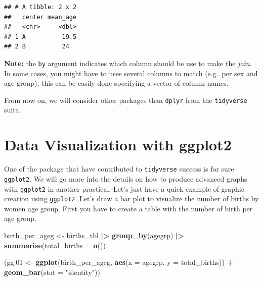 \documentclass[
]{book}
\newenvironment{Shaded}{\begin{snugshade}}{\end{snugshade}}
\newcommand{\AttributeTok}[1]{\textcolor[rgb]{0.13,0.29,0.53}{#1}}
\newcommand{\FloatTok}[1]{\textcolor[rgb]{0.00,0.00,0.81}{#1}}
\newcommand{\FunctionTok}[1]{\textcolor[rgb]{0.13,0.29,0.53}{\textbf{#1}}}
\newcommand{\NormalTok}[1]{#1}
\newcommand{\OtherTok}[1]{\textcolor[rgb]{0.56,0.35,0.01}{#1}}
\newcommand{\SpecialCharTok}[1]{\textcolor[rgb]{0.81,0.36,0.00}{\textbf{#1}}}
\newcommand{\StringTok}[1]{\textcolor[rgb]{0.31,0.60,0.02}{#1}}
\begin{document}
\begin{verbatim}
## # A tibble: 2 x 2
##   center mean_age
##   <chr>     <dbl>
## 1 A          19.5
## 2 B          24
\end{verbatim}

\textbf{Note:} the \texttt{by} argument indicates which column should be use to make the \emph{join}. In some
cases, you might have to uses several columns to match (e.g.~per sex and age group), this
can be easily done specifying a vector of column names.

From now on, we will consider other packages than \texttt{dplyr} from the \texttt{tidyverse} suits.

\section{Data Visualization with ggplot2}\label{data-visualization-with-ggplot2}

One of the package that have contributed to \texttt{tidyverse} success is for sure \texttt{ggplot2}.
We will go more into the details on how to produce advanced graphs with \texttt{ggplot2} in another practical.
Let's just have a quick example of graphic creation using \texttt{ggplot2}.
Let's draw a bar plot to visualize the number of births by women age group.
First you have to create a table with the number of birth per age group.

\begin{Shaded}
\begin{Highlighting}[]
\NormalTok{birth\_per\_ageg }\OtherTok{\textless{}{-}}\NormalTok{ births\_tbl }\SpecialCharTok{|\textgreater{}}
  \FunctionTok{group\_by}\NormalTok{(agegrp) }\SpecialCharTok{|\textgreater{}}
  \FunctionTok{summarise}\NormalTok{(}\AttributeTok{total\_births =} \FunctionTok{n}\NormalTok{())}
\end{Highlighting}
\end{Shaded}

\begin{Shaded}
\begin{Highlighting}[]
\NormalTok{(gg}\FloatTok{.01} \OtherTok{\textless{}{-}}
  \FunctionTok{ggplot}\NormalTok{(birth\_per\_ageg, }\FunctionTok{aes}\NormalTok{(}\AttributeTok{x =}\NormalTok{ agegrp, }\AttributeTok{y =}\NormalTok{ total\_births)) }\SpecialCharTok{+}
  \FunctionTok{geom\_bar}\NormalTok{(}\AttributeTok{stat =} \StringTok{"identity"}\NormalTok{))}
\end{Highlighting}
\end{Shaded}
\end{document}
